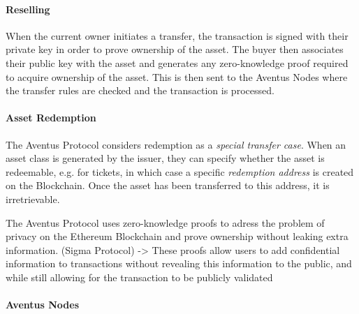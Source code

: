 
\paragraph{Reselling}

When the current owner initiates a transfer, the transaction is signed with their private key in order to prove ownership of the asset. The buyer then associates their public key with the asset and generates any zero-knowledge proof required to acquire ownership of the asset. This is then sent to the Aventus Nodes where the transfer rules are checked and the transaction is processed.

\paragraph{Asset Redemption}

The Aventus Protocol considers redemption as a \textit{special transfer case}. When an asset class is generated by the issuer, they can specify whether the asset is redeemable, e.g. for tickets, in which case a specific \textit{redemption address} is created on the Blockchain. Once the asset has been transferred to this address, it is irretrievable.

The Aventus Protocol uses zero-knowledge proofs to adress the problem of privacy on the Ethereum Blockchain and prove ownership without leaking extra information. (Sigma Protocol)
-> These proofs allow users to add confidential information to transactions without revealing this information to the public, and while still allowing for the transaction to be publicly validated


\paragraph{Aventus Nodes}



